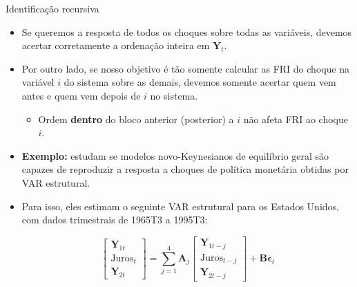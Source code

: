 \documentclass[11pt]{beamer}
\begin{document}
\begin{frame}{Identificação recursiva}
	\begin{itemize}
		\item Se queremos a resposta de todos os choques sobre todas as variáveis, devemos acertar corretamente a ordenação inteira em $\boldsymbol{Y}_t$.
		\item Por outro lado, se nosso objetivo é tão somente calcular as FRI do choque na variável $i$ do sistema sobre as demais, devemos somente acertar quem vem antes e quem vem depois de $i$ no sistema.
		\begin{itemize}
			\item Ordem \textbf{dentro} do bloco anterior (posterior) a $i$ não afeta FRI ao choque $i$.
		\end{itemize}
		\item \textbf{Exemplo:} \citet{Christiano2005} estudam  se modelos novo-Keynesianos de equilíbrio geral são capazes de reproduzir a resposta a choques de política monetária obtidas por VAR estrutural.
		\item Para isso, eles estimam o seguinte VAR estrutural para os Estados Unidos, com dados trimestrais de 1965T3 a 1995T3:
		
		$$\begin{bmatrix}
			\boldsymbol{Y}_{1t} \\
			\text{Juros}_{t} \\
				\boldsymbol{Y}_{2t}
		\end{bmatrix} = \sum_{j=1}^4 \boldsymbol{A}_j \begin{bmatrix}
		\boldsymbol{Y}_{1t-j} \\
		\text{Juros}_{t-j} \\
		\boldsymbol{Y}_{2t-j}
		\end{bmatrix} + \boldsymbol{B}\boldsymbol{\epsilon}_t$$
		
	\end{itemize}
\end{frame}
\end{document}
